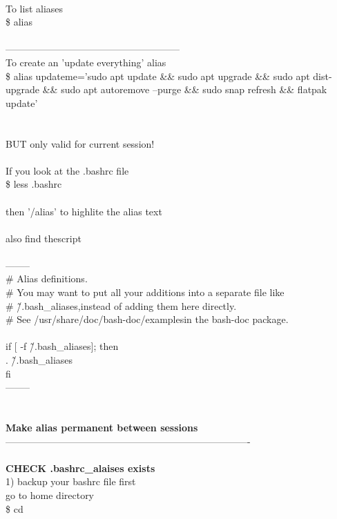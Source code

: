 \documentclass[10pt,a4paper]{article}
\begin{document}
{{{{{{{{{{{{{{{{{{{{{\\
To list aliases\\
\$ alias\\
\\
------------------------------------------------------\\
To create an 'update everything' alias\\
\$ alias updateme='sudo apt update \&\& sudo apt upgrade \&\& sudo apt dist-upgrade \&\& sudo apt autoremove --purge \&\& sudo snap refresh \&\& flatpak update'\\
\\
[Note: to remove this it's just \$ unalias updateme ]\\
BUT only valid for current session!\\
\\
If you look at the .bashrc file\\
\$ less .bashrc\\
\\
then '/alias' to highlite the alias text\\
\\
also find thescript\\
\\
--------\\
\# Alias definitions.\\
\# You may want to put all your additions into a separate file like\\
\# \~/.bash\_aliases,}{\large  instead of adding them here directly.\\
\# See /usr/share/doc/bash-doc/examples}{\large  in the bash-doc package.\\
\\
if [ -f \~/.bash\_aliases}{\large  ]; then\\
    . \~/.bash\_aliases}{\large \\
fi\\
--------\\
\\
\\
}\textbf{{\Large Make alias permanent between sessions}}{\large \\
----------------------------------------------------------------------------\\
\\
\textbf{CHECK .bashrc\_alaises exists}}{\large \\
1) backup your bashrc file first\\
go to home directory\\
\$ cd \~\\
}}}}}}}}}}}}}}}}}}}}}
\end{document}
